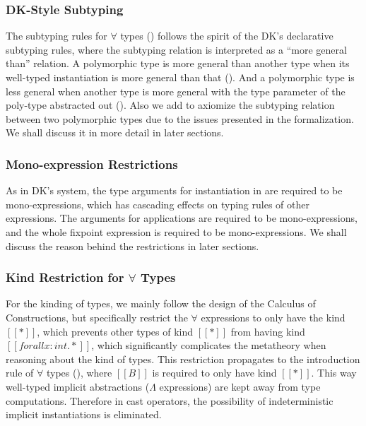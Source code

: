 \documentclass{llncs}
\begin{document}
\subsubsection{DK-Style Subtyping}

The subtyping rules for $\forall$ types () follows
the spirit of the DK's declarative subtyping rules\cite{DunfieldJoshua2013Caeb},
where the subtyping relation is interpreted as a ``more general than'' relation.
A polymorphic type is more general than another type when its well-typed
instantiation is more general than that (). And a polymorphic
type is less general when another type is more general with the type parameter of
the poly-type abstracted out (). Also we add 
to axiomize the subtyping relation between two polymorphic types due to the
issues presented in the formalization.
We shall discuss it in more detail in later sections.


\subsubsection{Mono-expression Restrictions}

As in DK's system, the type arguments for instantiation in  are
required to be mono-expressions, which has cascading effects on typing rules of
other expressions. The arguments for applications are required to be
mono-expressions, and the whole fixpoint expression is required to be mono-expressions. We shall
discuss the reason behind the restrictions in later sections.

\subsubsection{Kind Restriction for $\forall$ Types}
\label{sec:kind-restriction}

For the kinding of types, we mainly follow the design of the Calculus of
Constructions\cite{CoquandThierry1988Tcoc}, but specifically restrict the $\forall$
expressions to only have the kind $[[*]]$, which prevents other types of kind
$[[*]]$ from having kind $[[forall x : int. *]]$, which significantly complicates
the metatheory when reasoning about the kind of types.
This restriction propagates to the introduction rule of $\forall$ types (),
where $[[B]]$ is required to only have kind $[[*]]$.
This way well-typed implicit abstractions ($\Lambda$ expressions) are kept away
from type computations. Therefore in cast operators,
the possibility of indeterministic implicit instantiations is eliminated.
\end{document}

